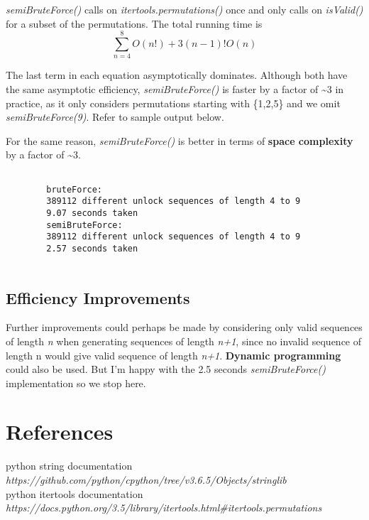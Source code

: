 \documentclass{article}
\begin{document}
\textit{semiBruteForce()}  calls on \textit{itertools.permutations()} once and only calls on \textit{isValid()} for a subset of the permutations. The total running time is
\[\sum\limits_{n=4}^8 O(n!)+3(n-1)!O(n)\]

The last term in each equation asymptotically dominates. Although both have the same asymptotic efficiency, \textit{semiBruteForce()} is faster by a factor of \textasciitilde3 in practice, as it only considers permutations starting with \{1,2,5\} and we omit \textit{semiBruteForce(9)}. Refer to sample output below.

For the same reason, \textit{semiBruteForce()} is better in terms of \textbf{space complexity} by a factor of \textasciitilde3. 

\begin{commandline}
	\begin{verbatim}
    
		bruteForce:  
		389112 different unlock sequences of length 4 to 9 
		9.07 seconds taken 
		semiBruteForce:  
		389112 different unlock sequences of length 4 to 9 
		2.57 seconds taken
        
	\end{verbatim}
\end{commandline}

\subsection{Efficiency Improvements} %
Further improvements could perhaps be made by considering only valid sequences of length \textit{n} when generating sequences of length \textit{n+1}, since no invalid sequence of length n would give valid sequence of length \textit{n+1}. \textbf{Dynamic programming} could also be used. But I’m happy with the 2.5 seconds \textit{semiBruteForce()} implementation so we stop here.

\section*{References} %

python string documentation \textit{https://github.com/python/cpython/tree/v3.6.5/Objects/stringlib}\\
python itertools documentation \textit{https://docs.python.org/3.5/library/itertools.html\#itertools.permutations}
\end{document}
